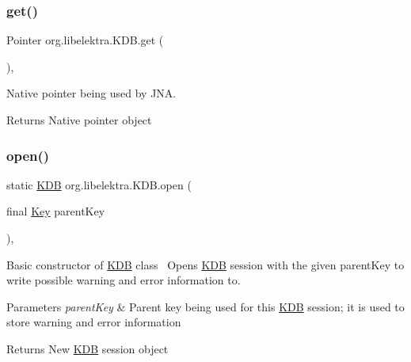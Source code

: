 \subsubsection{\texorpdfstring{get()}{get()}\hspace{0.1cm}{\footnotesize\ttfamily [2/2]}}
{\footnotesize\ttfamily Pointer org.\+libelektra.\+K\+D\+B.\+get (\begin{DoxyParamCaption}{ }\end{DoxyParamCaption})\hspace{0.3cm}{\ttfamily [inline]}, {\ttfamily [protected]}}



Native pointer being used by J\+NA. 

\begin{DoxyReturn}{Returns}
Native pointer object 
\end{DoxyReturn}
\mbox{\label{classorg_1_1libelektra_1_1KDB_ae7e6c1cea2b930a077aec11c3cbdef4b}} 
\subsubsection{\texorpdfstring{open()}{open()}}
{\footnotesize\ttfamily static \hyperlink{classorg_1_1libelektra_1_1KDB}{K\+DB} org.\+libelektra.\+K\+D\+B.\+open (\begin{DoxyParamCaption}\item[{final \hyperlink{classorg_1_1libelektra_1_1Key}{Key}}]{parent\+Key }\end{DoxyParamCaption})\hspace{0.3cm}{\ttfamily [inline]}, {\ttfamily [static]}}



Basic constructor of \hyperlink{classorg_1_1libelektra_1_1KDB}{K\+DB} class~\newline
 Opens \hyperlink{classorg_1_1libelektra_1_1KDB}{K\+DB} session with the given parent\+Key to write possible warning and error information to. 


\begin{DoxyParams}{Parameters}
{\em parent\+Key} & Parent key being used for this \hyperlink{classorg_1_1libelektra_1_1KDB}{K\+DB} session; it is used to store warning and error information \\
\hline
\end{DoxyParams}
\begin{DoxyReturn}{Returns}
New \hyperlink{classorg_1_1libelektra_1_1KDB}{K\+DB} session object 
\end{DoxyReturn}
\mbox{\label{classorg_1_1libelektra_1_1KDB_a4e7f86ca77f654bb11a38cdf6db6383f}} 
